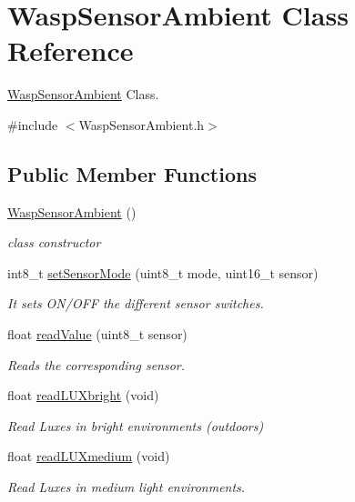 \hypertarget{class_wasp_sensor_ambient}{}\section{Wasp\+Sensor\+Ambient Class Reference}
\label{class_wasp_sensor_ambient}


\hyperlink{class_wasp_sensor_ambient}{Wasp\+Sensor\+Ambient} Class.  




{\ttfamily \#include $<$Wasp\+Sensor\+Ambient.\+h$>$}

\subsection*{Public Member Functions}
\begin{DoxyCompactItemize}
\item 
\hyperlink{class_wasp_sensor_ambient_a53e090ecc0d2c78eea7c8f683d7a1a56}{Wasp\+Sensor\+Ambient} ()
\begin{DoxyCompactList}\small\item\em class constructor \end{DoxyCompactList}\item 
int8\+\_\+t \hyperlink{class_wasp_sensor_ambient_a0f032f3688ec2c44681552ff503d8b47}{set\+Sensor\+Mode} (uint8\+\_\+t mode, uint16\+\_\+t sensor)
\begin{DoxyCompactList}\small\item\em It sets O\+N/\+O\+FF the different sensor switches. \end{DoxyCompactList}\item 
float \hyperlink{class_wasp_sensor_ambient_a06aa0c258f649dc81b1706f24a96bd1d}{read\+Value} (uint8\+\_\+t sensor)
\begin{DoxyCompactList}\small\item\em Reads the corresponding sensor. \end{DoxyCompactList}\item 
float \hyperlink{class_wasp_sensor_ambient_a6f56cd6727275acbb63cb85590a9177f}{read\+L\+U\+Xbright} (void)
\begin{DoxyCompactList}\small\item\em Read Luxes in bright environments (outdoors) \end{DoxyCompactList}\item 
float \hyperlink{class_wasp_sensor_ambient_a79065afd6980c2e50e983f32979248fc}{read\+L\+U\+Xmedium} (void)
\begin{DoxyCompactList}\small\item\em Read Luxes in medium light environments. \end{DoxyCompactList}\item 

\end{DoxyCompactItemize}
